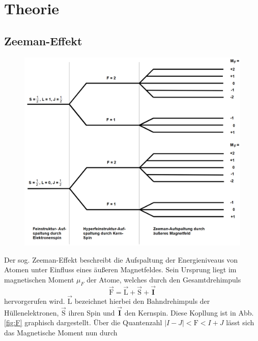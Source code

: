 \section{Theorie}
\label{sec:Theorie}

\subsection{Zeeman-Effekt}
\begin{figure}
  \includegraphics{./Niveaus.PNG}
  \caption{\cite{Anleitung}}
  \label{fig:Zeemann}
\end{figure}
Der sog. Zeeman-Effekt beschreibt die Aufspaltung der Energieniveaus von Atomen unter Einfluss eines äußeren Magnetfeldes.
Sein Ursprung liegt im magnetischen Moment $\mu_F$ der Atome, welches durch den Gesamtdrehimpuls
\begin{equation}
  \vec{\text{F}}=\vec{\text{L}}+\vec{\text{S}}+\vec{\mathbf{I}}
  \label{eqn:F}
\end{equation}
hervorgerufen wird. $\vec{\text{L}}$ bezeichnet hierbei den Bahndrehimpuls der Hüllenelektronen, $\vec{\text{S}}$ ihren Spin und $\vec{\mathbf{I}}$ den Kernspin. Diese Kopllung ist in Abb. \ref{fig:F} graphisch dargestellt.
Über die Quantenzahl $|I-J|<\text{F}<I+J$ lässt sich das Magnetische Moment nun durch

